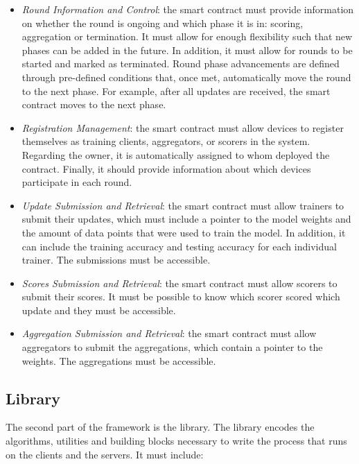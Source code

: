 \begin{itemize}
    \item \textit{Round Information and Control}: the smart contract must provide information on whether the round is ongoing and which phase it is in: scoring, aggregation or termination. It must allow for enough flexibility such that new phases can be added in the future. In addition, it must allow for rounds to be started and marked as terminated. Round phase advancements are defined through pre-defined conditions that, once met, automatically move the round to the next phase. For example, after all updates are received, the smart contract moves to the next phase.
    
    \item \textit{Registration Management}: the smart contract must allow devices to register themselves as training clients, aggregators, or scorers in the system. Regarding the owner, it is automatically assigned to whom deployed the contract. Finally, it should provide information about which devices participate in each round.
    
    \item \textit{Update Submission and Retrieval}: the smart contract must allow trainers to submit their updates, which must include a pointer to the model weights and the amount of data points that were used to train the model. In addition, it can include the training accuracy and testing accuracy for each individual trainer. The submissions must be accessible.
    
    \item \textit{Scores Submission and Retrieval}: the smart contract must allow scorers to submit their scores. It must be possible to know which scorer scored which update and they must be accessible.
    
    \item \textit{Aggregation Submission and Retrieval}: the smart contract must allow aggregators to submit the aggregations, which contain a pointer to the weights. The aggregations must be accessible.
\end{itemize}

\subsection{Library}\label{meth:library}

The second part of the framework is the library. The library encodes the algorithms, utilities and building blocks necessary to write the process that runs on the clients and the servers. It must include:

